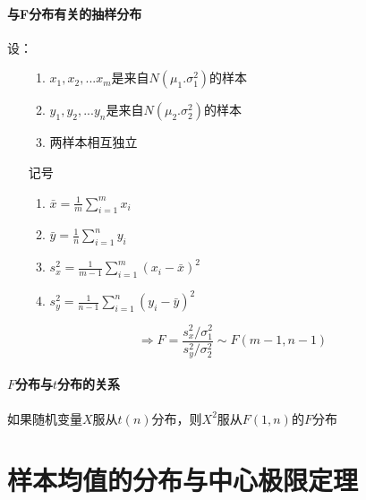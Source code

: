 \documentclass[UTF8,10pt]{book}
\begin{document}
            \paragraph{与F分布有关的抽样分布} 设：
            \begin{itemize}
            	\item [] {
            		\begin{enumerate}
            			\item $x_1,x_2,...x_m$是来自$N(\mu_1.\sigma^2_1)$的样本
            			\item $y_1,y_2,...y_n$是来自$N(\mu_2.\sigma^2_2)$的样本
            			\item 两样本相互独立
            		\end{enumerate}
            	}
            \end{itemize}
        \begin{itemize}
        	\item [记号] {
        		\begin{enumerate}
        			\item $ \bar{x}=\frac{1}{m} \sum_{i=1}^{m} x_{i} $
        			\item $ \bar{y}=\frac{1}{n} \sum_{i=1}^{n} y_{i}$
        			\item $ s_{x}^{2}=\frac{1}{m-1} \sum_{i=1}^{m}\left(x_{i}-\bar{x}\right)^{2}$
        			\item $ s_{y}^{2}=\frac{1}{n-1} \sum_{i=1}^{n}\left(y_{i}-\bar{y}\right)^{2}$
        			
        		\end{enumerate}
        	}
        \end{itemize}
    	
    	$$ \Rightarrow F=\frac{s_{x}^{2} / \sigma_{1}^{2}}{s_{y}^{2} / \sigma_{2}^{2}} \sim F(m-1, n-1) $$
    	


            \paragraph{$F$分布与$t$分布的关系} {\kaishu 如果随机变量$X$服从$t(n)$分布，则$X^2$服从$F(1,n)$的$F$分布}

            
    
    \section{样本均值的分布与中心极限定理}
\end{document}
